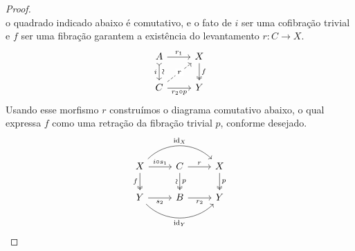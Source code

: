 \begin{proof}
\begin{displaymath}
  \end{displaymath}
  o quadrado indicado abaixo é comutativo, e o fato de $i$ ser uma cofibração trivial e $f$ ser uma fibração garantem a existência do levantamento $r: C \to X$.
  \begin{displaymath}
    \begin{tikzcd}
      A
      \arrow[r, "r_{1}"]
      \arrow[d, tail, "i" {swap}, "\sim" {sloped}]
      & X
      \arrow[d, two heads, "f"]
      \\ C
      \arrow[r, "r_{2} \circ p" swap]
      \arrow[ru, dashed, "r" description]
      & Y
    \end{tikzcd}
  \end{displaymath}
  Usando esse morfismo $r$ construímos o diagrama comutativo abaixo, o qual expressa $f$ como uma retração da fibração trivial $p$, conforme desejado.
  \begin{displaymath}
    \begin{tikzcd}
      X
      \arrow[r, "i \circ s_{1}"]
      \arrow[d, two heads, "f" swap]
      \arrow[rr, bend left=45, "\id_{X}"]
      & C
      \arrow[r, "r"]
      \arrow[d, two heads, "p", "\sim" {swap, sloped}]
      & X
      \arrow[d, two heads, "p"]
      \\ Y
      \arrow[r, "s_{2}" swap]
      \arrow[rr, bend right=45, "\id_{Y}" swap]
      & B
      \arrow[r, "r_{2}" swap]
      & Y
    \end{tikzcd}
  \end{displaymath}


\end{proof}
